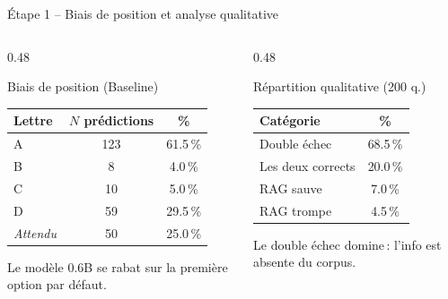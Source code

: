 \documentclass[aspectratio=169, 12pt]{beamer}
\newcommand{\negatif}[1]{\textcolor{red!70!black}{#1}}
\begin{document}
\begin{frame}{\'Etape 1 -- Biais de position et analyse qualitative}
  \begin{columns}[T]
    \begin{column}{0.48\textwidth}
      \begin{block}{Biais de position (Baseline)}
        \centering
        \begin{tabular}{@{} l c c @{}}
          \toprule
          \textbf{Lettre} & \textbf{$N$ pr\'edictions} & \textbf{\%} \\
          \midrule
          A & 123 & \negatif{61.5\,\%} \\
          B & 8 & 4.0\,\% \\
          C & 10 & 5.0\,\% \\
          D & 59 & 29.5\,\% \\
          \midrule
          \textit{Attendu} & 50 & 25.0\,\% \\
          \bottomrule
        \end{tabular}

        \vspace{0.2cm}
        \small Le mod\`ele 0.6B se rabat sur la premi\`ere option par d\'efaut.
      \end{block}
    \end{column}
    \begin{column}{0.48\textwidth}
      \begin{block}{R\'epartition qualitative (200 q.)}
        \centering
        \begin{tabular}{@{} l c @{}}
          \toprule
          \textbf{Cat\'egorie} & \textbf{\%} \\
          \midrule
          \rowcolor{gray!10}
          Double \'echec & 68.5\,\% \\
          Les deux corrects & 20.0\,\% \\
          \rowcolor{green!8}
          RAG sauve & 7.0\,\% \\
          \rowcolor{red!8}
          RAG trompe & 4.5\,\% \\
          \bottomrule
        \end{tabular}

        \vspace{0.2cm}
        \small Le double \'echec domine\,: l'info est absente du corpus.
      \end{block}
    \end{column}
  \end{columns}
\end{frame}
\end{document}
